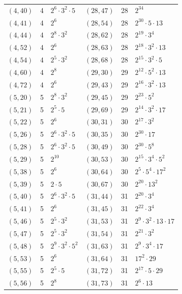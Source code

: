 \documentclass[11pt]{article}
\begin{document}
\begin{longtable}{@{}lrl@{\qquad}lrl@{}}
$(4,40)$ & 4 & $2^{6}\cdot 3^{2}\cdot 5$ & $(28,47)$ & 28 & $2^{34}$\\
$(4,41)$ & 4 & $2^{6}$ & $(28,54)$ & 28 & $2^{30}\cdot 5\cdot 13$\\
$(4,44)$ & 4 & $2^{8}\cdot 3^{2}$ & $(28,62)$ & 28 & $2^{19}\cdot 3^{4}$\\
$(4,52)$ & 4 & $2^{6}$ & $(28,63)$ & 28 & $2^{18}\cdot 3^{2}\cdot 13$\\
$(4,54)$ & 4 & $2^{5}\cdot 3^{2}$ & $(28,68)$ & 28 & $2^{15}\cdot 3^{2}\cdot 5$\\
$(4,60)$ & 4 & $2^{8}$ & $(29,30)$ & 29 & $2^{12}\cdot 5^{2}\cdot 13$\\
$(4,72)$ & 4 & $2^{6}$ & $(29,43)$ & 29 & $2^{16}\cdot 3^{2}\cdot 13$\\
$(5,20)$ & 5 & $2^{8}\cdot 3^{2}$ & $(29,45)$ & 29 & $2^{23}\cdot 5^{2}$\\
$(5,21)$ & 5 & $2^{5}\cdot 5$ & $(29,69)$ & 29 & $2^{14}\cdot 3^{2}\cdot 17$\\
$(5,22)$ & 5 & $2^{6}$ & $(30,31)$ & 30 & $2^{17}\cdot 3^{2}$\\
$(5,26)$ & 5 & $2^{6}\cdot 3^{2}\cdot 5$ & $(30,35)$ & 30 & $2^{30}\cdot 17$\\
$(5,28)$ & 5 & $2^{6}\cdot 3^{2}\cdot 5$ & $(30,49)$ & 30 & $2^{30}\cdot 5^{8}$\\
$(5,29)$ & 5 & $2^{10}$ & $(30,53)$ & 30 & $2^{15}\cdot 3^{4}\cdot 5^{2}$\\
$(5,38)$ & 5 & $2^{6}$ & $(30,64)$ & 30 & $2^{5}\cdot 5^{4}\cdot 17^{2}$\\
$(5,39)$ & 5 & $2\cdot 5$ & $(30,67)$ & 30 & $2^{20}\cdot 13^{2}$\\
$(5,40)$ & 5 & $2^{6}\cdot 3^{2}\cdot 5$ & $(31,44)$ & 31 & $2^{20}\cdot 3^{4}$\\
$(5,41)$ & 5 & $2^{6}$ & $(31,45)$ & 31 & $2^{22}\cdot 3^{4}$\\
$(5,46)$ & 5 & $2^{5}\cdot 3^{2}$ & $(31,53)$ & 31 & $2^{9}\cdot 3^{2}\cdot 13\cdot 17$\\
$(5,47)$ & 5 & $2^{5}\cdot 3^{2}$ & $(31,54)$ & 31 & $2^{21}\cdot 3^{2}$\\
$(5,48)$ & 5 & $2^{9}\cdot 3^{2}\cdot 5^{2}$ & $(31,63)$ & 31 & $2^{9}\cdot 3^{4}\cdot 17$\\
$(5,53)$ & 5 & $2^{6}$ & $(31,64)$ & 31 & $17^{2}\cdot 29$\\
$(5,55)$ & 5 & $2^{5}\cdot 5$ & $(31,72)$ & 31 & $2^{17}\cdot 5\cdot 29$\\
$(5,56)$ & 5 & $2^{8}$ & $(31,73)$ & 31 & $2^{6}\cdot 13$\\

\end{longtable}
\end{document}
